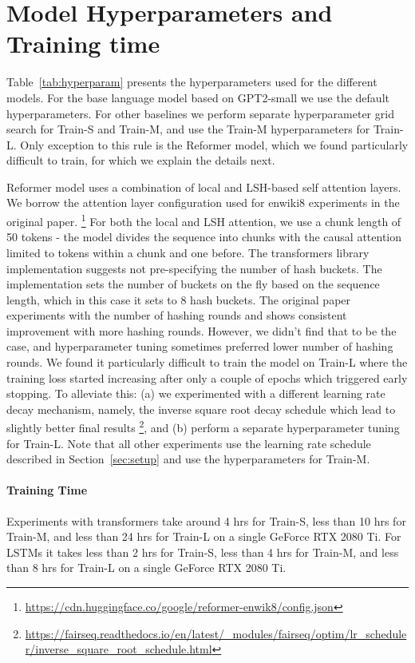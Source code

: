 \section{Model Hyperparameters and Training time}
\label{sec:hyperparams}
Table~\ref{tab:hyperparam} presents the hyperparameters used for the different models. For the base language model based on GPT2-small we use the default hyperparameters. For other baselines we perform separate hyperparameter grid search for Train-S and Train-M, and use the Train-M hyperparameters for Train-L. 
Only exception to this rule is the Reformer model, which we found particularly difficult to train, for which we explain the details next.

Reformer model uses a combination of local and LSH-based self attention layers. We borrow the attention layer configuration used for enwiki8 experiments in the original paper. \footnote{\url{https://cdn.huggingface.co/google/reformer-enwik8/config.json}} 
For both the local and LSH attention, we use a chunk length of 50 tokens - the model divides the sequence into chunks with the causal attention limited to tokens within a chunk and one before.
The transformers library implementation suggests not pre-specifying the number of hash buckets. The implementation sets the number of buckets on the fly based on the sequence length, which in this case it sets to 8 hash buckets. The original paper experiments with the number of hashing rounds and shows consistent improvement with more hashing rounds. However, we didn't find that to be the case, and hyperparameter tuning sometimes preferred lower number of hashing rounds. 
We found it particularly difficult to train the model on Train-L where the training loss started increasing after only a couple of epochs which triggered early stopping. To alleviate this: (a) we experimented with a different learning rate decay mechanism, namely, the inverse square root decay schedule which lead to slightly better final results  \footnote{\url{https://fairseq.readthedocs.io/en/latest/_modules/fairseq/optim/lr_scheduler/inverse_square_root_schedule.html}}, and (b) perform a separate hyperparameter tuning for Train-L.  
Note that all other experiments use the learning rate schedule described in Section~\ref{sec:setup} and use the hyperparameters for Train-M.  

\paragraph{Training Time}
Experiments with transformers take around 4 hrs for Train-S, less than 10 hrs for Train-M, and less than 24 hrs for Train-L on a single GeForce RTX 2080 Ti. For LSTMs it takes less than 2 hrs for Train-S, less than 4 hrs for Train-M, and less than 8 hrs for Train-L on a single GeForce RTX 2080 Ti.


